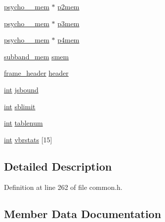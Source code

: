 \begin{DoxyCompactItemize}
\item 
\hyperlink{twolame_2libtwolame_2common_8h_a031c0fc1b7a995cbdd26ab4b96f556bf}{psycho\+\_\+\_\+mem} $\ast$ \hyperlink{structtwolame__options__struct_ad9d3c600a874f43c1e7be23570ca4e88}{p2mem}
\item 
\hyperlink{twolame_2libtwolame_2common_8h_a3c126cfbb1431d9c8b12f52d038543f6}{psycho\+\_\+\_\+mem} $\ast$ \hyperlink{structtwolame__options__struct_a27b52180e8edfd8e2e448a488a05a3de}{p3mem}
\item 
\hyperlink{twolame_2libtwolame_2common_8h_a381a1c9329f866f3b831860984eb6710}{psycho\+\_\+\_\+mem} $\ast$ \hyperlink{structtwolame__options__struct_ae24effdce105e10aa58a549ae9f5f047}{p4mem}
\item 
\hyperlink{twolame_2libtwolame_2common_8h_ac99684183e3f1354e87dea82c4b6cc7f}{subband\+\_\+mem} \hyperlink{structtwolame__options__struct_ab497609172fe5f75806d2eb2518b206f}{smem}
\item 
\hyperlink{structframe__header}{frame\+\_\+header} \hyperlink{structtwolame__options__struct_a50fa0b33674f61d8e3386b3e8d54b78c}{header}
\item 
\hyperlink{xmltok_8h_a5a0d4a5641ce434f1d23533f2b2e6653}{int} \hyperlink{structtwolame__options__struct_ad177ef737c518ac27a6a76085ec47b40}{jsbound}
\item 
\hyperlink{xmltok_8h_a5a0d4a5641ce434f1d23533f2b2e6653}{int} \hyperlink{structtwolame__options__struct_ace0e0a1e04ffe3ec27bf782edac6973b}{sblimit}
\item 
\hyperlink{xmltok_8h_a5a0d4a5641ce434f1d23533f2b2e6653}{int} \hyperlink{structtwolame__options__struct_a619758b697006462f7c89fc0a7330cc8}{tablenum}
\item 
\hyperlink{xmltok_8h_a5a0d4a5641ce434f1d23533f2b2e6653}{int} \hyperlink{structtwolame__options__struct_a814a435587623bfa5430c511c80ce753}{vbrstats} \mbox{[}15\mbox{]}
\end{DoxyCompactItemize}


\subsection{Detailed Description}


Definition at line 262 of file common.\+h.



\subsection{Member Data Documentation}
